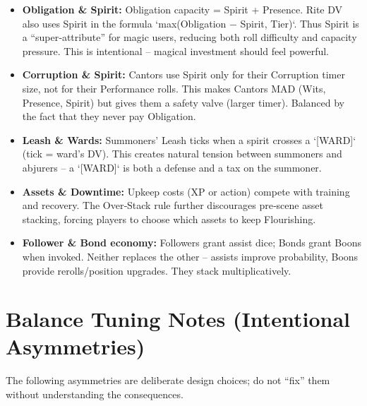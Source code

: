 \documentclass[11pt]{article}
\begin{document}
\begin{itemize}
    \item \textbf{Obligation \& Spirit:} Obligation capacity = Spirit + Presence. Rite DV also uses Spirit in the formula `max(Obligation − Spirit, Tier)`. Thus Spirit is a “super‑attribute” for magic users, reducing both roll difficulty and capacity pressure. This is intentional – magical investment should feel powerful.
    \item \textbf{Corruption \& Spirit:} Cantors use Spirit only for their Corruption timer size, not for their Performance rolls. This makes Cantors MAD (Wits, Presence, Spirit) but gives them a safety valve (larger timer). Balanced by the fact that they never pay Obligation.
    \item \textbf{Leash \& Wards:} Summoners’ Leash ticks when a spirit crosses a `[WARD]` (tick = ward's DV). This creates natural tension between summoners and abjurers – a `[WARD]` is both a defense and a tax on the summoner.
    \item \textbf{Assets \& Downtime:} Upkeep costs (XP or action) compete with training and recovery. The Over‑Stack rule further discourages pre‑scene asset stacking, forcing players to choose which assets to keep Flourishing.
    \item \textbf{Follower \& Bond economy:} Followers grant assist dice; Bonds grant Boons when invoked. Neither replaces the other – assists improve probability, Boons provide rerolls/position upgrades. They stack multiplicatively.
\end{itemize}

\section{Balance Tuning Notes (Intentional Asymmetries)}
\label{sec:balance-notes}

The following asymmetries are deliberate design choices; do not “fix” them without understanding the consequences.
\end{document}
